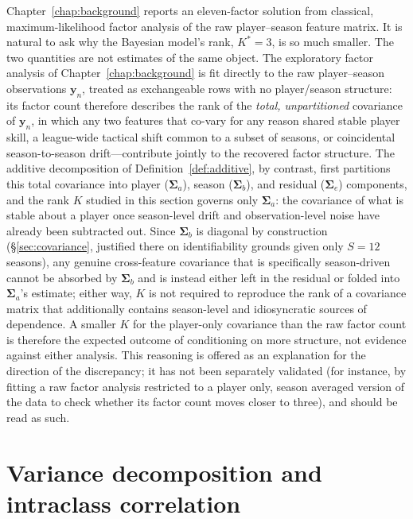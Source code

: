 \begin{remark}
\label{rem:k_not_comparable}
Chapter~\ref{chap:background} reports an eleven-factor solution from classical, maximum-likelihood factor analysis of the raw player--season feature matrix. It is natural to ask why the Bayesian model's rank, $K^*=3$, is so much smaller. The two quantities are not estimates of the same object. The exploratory factor analysis of Chapter~\ref{chap:background} is fit directly to the raw player--season observations $\mathbf{y}_n$, treated as exchangeable rows with no player/season structure: its factor count therefore describes the rank of the \emph{total, unpartitioned} covariance of $\mathbf{y}_n$, in which any two features that co-vary for any reason shared stable player skill, a league-wide tactical shift common to a subset of seasons, or coincidental season-to-season drift---contribute jointly to the recovered factor structure. The additive decomposition of Definition~\ref{def:additive}, by contrast, first partitions this total covariance into player ($\boldsymbol{\Sigma}_a$), season ($\boldsymbol{\Sigma}_b$), and residual ($\boldsymbol{\Sigma}_e$) components, and the rank $K$ studied in this section governs only $\boldsymbol{\Sigma}_a$: the covariance of what is stable about a player once season-level drift and observation-level noise have already been subtracted out. Since $\boldsymbol{\Sigma}_b$ is diagonal by construction (\S\ref{sec:covariance}, justified there on identifiability grounds given only $S=12$ seasons), any genuine cross-feature covariance that is specifically season-driven cannot be absorbed by $\boldsymbol{\Sigma}_b$ and is instead either left in the residual or folded into $\boldsymbol{\Sigma}_a$'s estimate; either way, $K$ is not required to reproduce the rank of a covariance matrix that additionally contains season-level and idiosyncratic sources of dependence. A smaller $K$ for the player-only covariance than the raw factor count is therefore the expected outcome of conditioning on more structure, not evidence against either analysis. This reasoning is offered as an explanation for the direction of the discrepancy; it has not been separately validated (for instance, by fitting a raw factor analysis restricted to a player only, season averaged version of the data to check whether its factor count moves closer to three), and should be read as such.
\end{remark}

\section{Variance decomposition and intraclass correlation}
\label{sec:icc}

